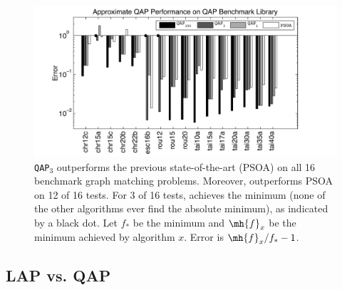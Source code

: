 \documentclass[10pt,journal,cspaper,compsoc]{IEEEtran}
\begin{document}
\begin{figure}[htbp]
	\centering			
	\includegraphics[width=1.0\linewidth]{../figs/benchmarks.pdf}
	\caption{\texttt{QAP}$_3$ outperforms the previous state-of-the-art (PSOA) on all 16 benchmark graph matching problems.  Moreover, \qapa outperforms PSOA on 12 of 16 tests.  For 3 of 16 tests, \qapb achieves the minimum (none of the other algorithms ever find the absolute minimum), as indicated by a black dot.  Let $f_*$ be the minimum and $\mh{f}_x$ be the minimum achieved by algorithm $x$.  Error is $\mh{f}_x/f_*-1$.  }
	\label{fig:fwpath}
\end{figure}





\subsection{LAP vs. QAP} %
\label{sub:lap_vs_qap}
\end{document}
